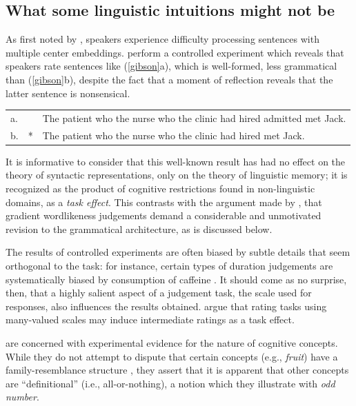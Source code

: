 \subsection{What some linguistic intuitions might not be}

As first noted by \citet{Chomsky1963b}, speakers experience difficulty processing sentences with multiple center embeddings.
\citet{Gibson1999} perform a controlled experiment which reveals that speakers rate sentences like (\ref{gibson}a), which is well-formed, less grammatical than (\ref{gibson}b), despite the fact that a moment of reflection reveals that the latter sentence is nonsensical.

\begin{example}
\label{gibson}
\begin{tabular}{l l@{}l}
a. &    & The patient who the nurse who the clinic had hired admitted met Jack. \\
b. & *  & The patient who the nurse who the clinic had hired met Jack. \\
\end{tabular}
\end{example}

\noindent
It is informative to consider that this well-known result has had no effect on the theory of syntactic representations, only on the theory of linguistic memory; it is recognized as the product of cognitive restrictions found in non-linguistic domains, as a \emph{task effect}.
This contrasts with the argument made by \citet{Hayes2000}, that gradient wordlikeness judgements demand a considerable and unmotivated revision to the grammatical architecture, as is discussed below.

The results of controlled experiments are often biased by subtle details that seem orthogonal to the task: for instance, certain types of duration judgements are systematically biased by consumption of caffeine \citep{Gruber2005}.
It should come as no surprise, then, that a highly salient aspect of a judgement task, the scale used for responses, also influences the results obtained.
\citet*{Armstrong1983} argue that rating tasks using many-valued scales may induce intermediate ratings as a task effect.

\citet{Armstrong1983} are concerned with experimental evidence for the nature of cognitive concepts.
While they do not attempt to dispute that certain concepts (e.g., \emph{fruit}) have a family-resemblance structure \citep[e.g.,][]{Rosch1975a}, they assert that it is apparent that other concepts are ``definitional'' (i.e., all-or-nothing), a notion which they illustrate with \emph{odd number}.

